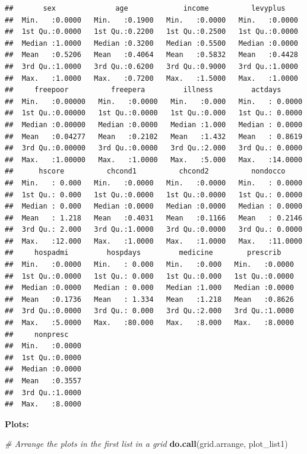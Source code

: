 \documentclass[
]{article}
\newenvironment{Shaded}{\begin{snugshade}}{\end{snugshade}}
\newcommand{\CommentTok}[1]{\textcolor[rgb]{0.56,0.35,0.01}{\textit{#1}}}
\newcommand{\FunctionTok}[1]{\textcolor[rgb]{0.13,0.29,0.53}{\textbf{#1}}}
\newcommand{\NormalTok}[1]{#1}
\begin{document}
\begin{verbatim}
##       sex              age             income          levyplus     
##  Min.   :0.0000   Min.   :0.1900   Min.   :0.0000   Min.   :0.0000  
##  1st Qu.:0.0000   1st Qu.:0.2200   1st Qu.:0.2500   1st Qu.:0.0000  
##  Median :1.0000   Median :0.3200   Median :0.5500   Median :0.0000  
##  Mean   :0.5206   Mean   :0.4064   Mean   :0.5832   Mean   :0.4428  
##  3rd Qu.:1.0000   3rd Qu.:0.6200   3rd Qu.:0.9000   3rd Qu.:1.0000  
##  Max.   :1.0000   Max.   :0.7200   Max.   :1.5000   Max.   :1.0000  
##     freepoor          freepera         illness         actdays       
##  Min.   :0.00000   Min.   :0.0000   Min.   :0.000   Min.   : 0.0000  
##  1st Qu.:0.00000   1st Qu.:0.0000   1st Qu.:0.000   1st Qu.: 0.0000  
##  Median :0.00000   Median :0.0000   Median :1.000   Median : 0.0000  
##  Mean   :0.04277   Mean   :0.2102   Mean   :1.432   Mean   : 0.8619  
##  3rd Qu.:0.00000   3rd Qu.:0.0000   3rd Qu.:2.000   3rd Qu.: 0.0000  
##  Max.   :1.00000   Max.   :1.0000   Max.   :5.000   Max.   :14.0000  
##      hscore          chcond1          chcond2          nondocco      
##  Min.   : 0.000   Min.   :0.0000   Min.   :0.0000   Min.   : 0.0000  
##  1st Qu.: 0.000   1st Qu.:0.0000   1st Qu.:0.0000   1st Qu.: 0.0000  
##  Median : 0.000   Median :0.0000   Median :0.0000   Median : 0.0000  
##  Mean   : 1.218   Mean   :0.4031   Mean   :0.1166   Mean   : 0.2146  
##  3rd Qu.: 2.000   3rd Qu.:1.0000   3rd Qu.:0.0000   3rd Qu.: 0.0000  
##  Max.   :12.000   Max.   :1.0000   Max.   :1.0000   Max.   :11.0000  
##     hospadmi         hospdays         medicine        prescrib     
##  Min.   :0.0000   Min.   : 0.000   Min.   :0.000   Min.   :0.0000  
##  1st Qu.:0.0000   1st Qu.: 0.000   1st Qu.:0.000   1st Qu.:0.0000  
##  Median :0.0000   Median : 0.000   Median :1.000   Median :0.0000  
##  Mean   :0.1736   Mean   : 1.334   Mean   :1.218   Mean   :0.8626  
##  3rd Qu.:0.0000   3rd Qu.: 0.000   3rd Qu.:2.000   3rd Qu.:1.0000  
##  Max.   :5.0000   Max.   :80.000   Max.   :8.000   Max.   :8.0000  
##     nonpresc     
##  Min.   :0.0000  
##  1st Qu.:0.0000  
##  Median :0.0000  
##  Mean   :0.3557  
##  3rd Qu.:1.0000  
##  Max.   :8.0000
\end{verbatim}

\textbf{Plots:}

\begin{Shaded}
\begin{Highlighting}[]
\CommentTok{\# Arrange the plots in the first list in a grid}
\FunctionTok{do.call}\NormalTok{(grid.arrange, plot\_list1)}
\end{Highlighting}
\end{Shaded}
\end{document}
